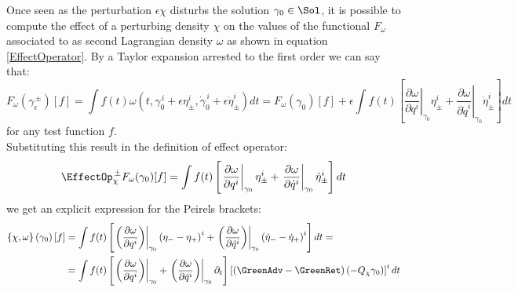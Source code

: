 \documentclass[Main]{subfiles}
\begin{document}
		Once seen as the perturbation $\epsilon \chi$ disturbs the solution $\gamma_0 \in \Sol$, it is possible to compute the effect of a perturbing density $\chi$ on the values of the functional $F_\omega$ associated to as second Lagrangian density $\omega$ as shown in equation \ref{EffectOperator}.
		By a Taylor expansion arrested to the first order we can say that:
		\begin{displaymath}
			F_\omega \left( \gamma_\epsilon^{\, \pm} \right) [f]= \int f(t) 
			\omega( t, \gamma_0^{\, i} + \epsilon \eta^i_\pm , \dot{\gamma}_0^{\, i} + \epsilon \dot{\eta}_\pm^i ) dt =
			F_\omega (\gamma_0) [f] + \epsilon \int f(t) \left[ 
			\left. \frac{\partial\omega}{\partial q^i}\right\vert_{\gamma_0} \eta^i_\pm +
			\left. \frac{\partial\omega}{\partial \dot{q}^i}\right\vert_{\gamma_0} \dot{\eta}^i_\pm 
			 \right] dt
		\end{displaymath}
		for any test function $f$.\\
		Substituting this result in the definition of effect operator:
		\begin{displaymath}
			\EffectOp_\chi^{\, \pm} F_\omega ( \gamma_0) [f] = \int f(t) \left[ 
			\left. \frac{\partial\omega}{\partial q^i}\right\vert_{\gamma_0} \eta^i_\pm +
			\left. \frac{\partial\omega}{\partial \dot{q}^i}\right\vert_{\gamma_0} \dot{\eta}^i_\pm 
			 \right] dt
		\end{displaymath}
		we get an explicit expression for the Peirels brackets:
		\begin{align}\label{EspressionePeierlsCampiCurve}
			\left\lbrace \chi , \omega \right\rbrace \left( \gamma_0 \right) [f] &=
			\int f(t) \left[ 
			\left.\left( \frac{\partial\omega}{\partial q^i}\right)\right\vert_{\gamma_0} \left( \eta_- - \eta_+\right)^i +
			\left.\left( \frac{\partial\omega}{\partial \dot{q}^i}\right)\right\vert_{\gamma_0} \left( \dot{\eta}_- - \dot{\eta}_+\right)^i 
			 \right] dt = \nonumber\\
			 &= \int f(t) 
			 \left[  
				\left.\left( \frac{\partial\omega}{\partial q^i}\right)\right\vert_{\gamma_0} +
				\left.\left( \frac{\partial\omega}{\partial \dot{q}^i}\right)\right\vert_{\gamma_0} \partial_t
			\right]
			\left[
				\left( \GreenAdv - \GreenRet \right)\left( - Q_\chi \gamma_0 \right)
			\right]^i				dt
		\end{align}
			
		
	 
	 	
\end{document}
